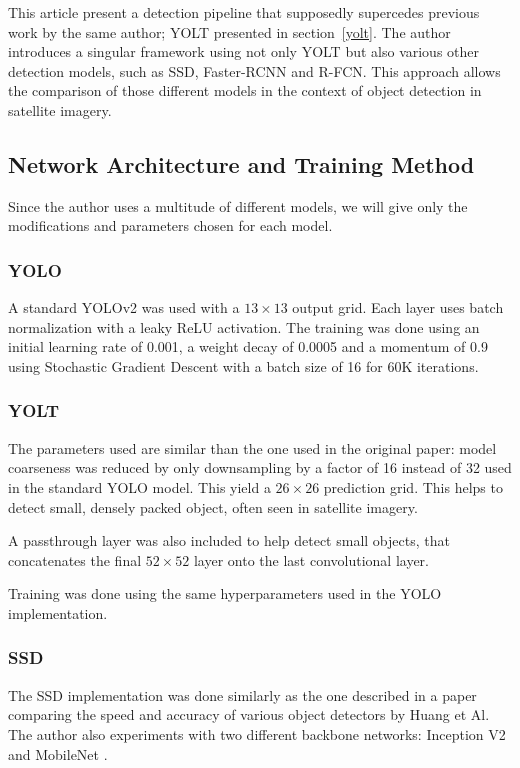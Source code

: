 
This article present a detection pipeline that supposedly supercedes previous work by the same author; YOLT\cite{yolt} presented in section~\ref{yolt}. The author introduces a singular framework using not only YOLT but also various other detection models, such as SSD\cite{ssd}, Faster-RCNN\cite{FasterRCNN} and R-FCN\cite{rfcn}. This approach allows the comparison of those different models in the context of object detection in satellite imagery.
\subsection{Network Architecture and Training Method}
Since the author uses a multitude of different models, we will give only the modifications and parameters chosen for each model.

\subsubsection{YOLO}
A standard YOLOv2\cite{yolov9000} was used with a $13 \times 13$ output grid. Each layer uses batch normalization with a leaky ReLU activation. The training was done using an initial learning rate of 0.001, a weight decay of 0.0005 and a momentum of 0.9 using Stochastic Gradient Descent with a batch size of 16 for 60K iterations.

\subsubsection{YOLT}
The parameters used are similar than the one used in the original paper\cite{yolt}: model coarseness was reduced by only downsampling by a factor of 16 instead of 32 used in the standard YOLO model. This yield a $26 \times 26$ prediction grid. This helps to detect small, densely packed object, often seen in satellite imagery.

A passthrough layer was also included to help detect small objects, that concatenates the final $52 \times 52$ layer onto the last convolutional layer. 

Training was done using the same hyperparameters used in the YOLO implementation.

\subsubsection{SSD}
The SSD implementation was done similarly as the one described in a paper comparing the speed and accuracy of various object detectors by Huang et Al\cite{huangAlObjDetectors}. The author also experiments with two different backbone networks: Inception V2 \cite{inceptionV2} and MobileNet \cite{mobileNet}.

